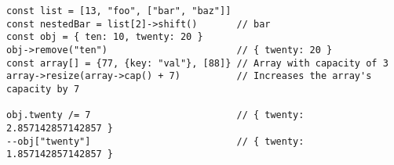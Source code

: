 \vspace{-2.25em}
\begin{center}
\begin{minipage}[t]{1\textwidth}
\begin{listing}[H]
\begin{spacing}{0.6}
\begin{verbatim}
const list = [13, "foo", ["bar", "baz"]]
const nestedBar = list[2]->shift()       // bar
const obj = { ten: 10, twenty: 20 }
obj->remove("ten")                       // { twenty: 20 }
const array[] = {77, {key: "val"}, [88]} // Array with capacity of 3
array->resize(array->cap() + 7)          // Increases the array's capacity by 7

obj.twenty /= 7                          // { twenty: 2.857142857142857 }
--obj["twenty"]                          // { twenty: 1.857142857142857 }
\end{verbatim}
\end{spacing}
\end{listing}
\end{minipage}
\end{center}
